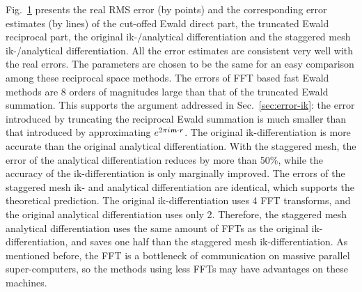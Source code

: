 \documentclass[aps,pre,preprint]{revtex4}
\renewcommand{\v}[1]{\textbf{\textit{#1}}}
\begin{document}
\begin{figure}
  \label{fig:error1}
\end{figure}

Fig.~\ref{fig:error1} presents the real RMS error (by points) and the
corresponding error estimates (by lines) of the cut-offed Ewald direct
part, the truncated Ewald reciprocal part, the original ik-/analytical
differentiation and the staggered mesh ik-/analytical
differentiation. All the error estimates are consistent very well
with the real errors.  The parameters are
chosen to be the same for an easy comparison among these 
reciprocal space methods.  The errors of FFT
based fast Ewald methods are 8 orders of magnitudes large than that of
the truncated Ewald summation.
This supports the argument addressed in
Sec.~\ref{sec:error-ik}: the error introduced by truncating the
reciprocal Ewald summation is much smaller than that introduced by
approximating $e^{2\pi i\v m\cdot\v r}$.
The original ik-differentiation is more accurate than
the original analytical differentiation.
With the staggered mesh,
the error of the analytical differentiation reduces by more than 50\%,
while the accuracy of the ik-differentiation is only marginally
improved.
The errors of the staggered mesh ik- and analytical differentiation
are identical, which supports the theoretical prediction.
The original ik-differentiation uses 4
FFT transforms, and the original analytical differentiation uses
only 2.  Therefore, the staggered mesh analytical differentiation uses
the same amount of FFTs as the original ik-differentiation, and saves
one half than the staggered mesh ik-differentiation.  As mentioned before,
the FFT is a bottleneck of communication on massive parallel
super-computers,
so the methods using less FFTs may have advantages on these machines.
\end{document}
